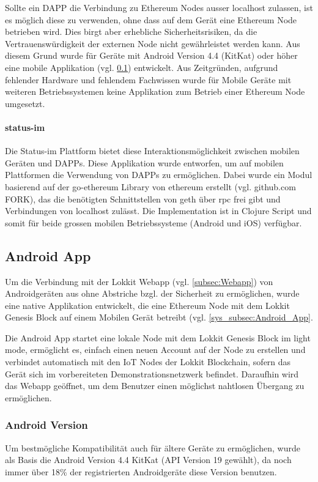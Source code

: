 Sollte ein \acrshort{DAPP} die Verbindung zu Ethereum Nodes ausser localhost zulassen, ist es möglich diese zu verwenden, ohne dass auf dem Gerät eine Ethereum Node betrieben wird. Dies birgt aber erhebliche Sicherheitsrisiken, da die Vertrauenswürdigkeit der externen Node nicht gewährleistet werden kann. Aus diesem Grund wurde für Geräte mit Android Version 4.4 (KitKat) oder höher eine mobile Applikation (vgl. \ref{subsec:Android_App}) entwickelt. Aus Zeitgründen, aufgrund fehlender Hardware und fehlendem Fachwissen wurde für Mobile Geräte mit weiteren Betriebssystemen keine Applikation zum Betrieb einer Ethereum Node umgesetzt.
\paragraph{status-im}
Die Status-im Plattform bietet diese Interaktionsmöglichkeit zwischen mobilen Geräten und \acrshort{DAPPs}. Diese Applikation wurde entworfen, um auf mobilen Plattformen die Verwendung von \acrshort{DAPPs} zu ermöglichen. Dabei wurde ein Modul basierend auf der go-ethereum Library von ethereum erstellt (vgl. github.com FORK), das die benötigten Schnittstellen von geth über rpc frei gibt und Verbindungen von localhost zulässt. Die Implementation ist in Clojure Script und somit für beide grossen mobilen Betriebssysteme (Android und iOS) verfügbar.\cite{status-im_whitepaper, github.com/status-im/status-go}

\subsection{Android App}
\label{subsec:Android_App}
Um die Verbindung mit der Lokkit Webapp (vgl. \ref{subsec:Webapp}) von Androidgeräten aus ohne Abstriche bzgl. der Sicherheit zu ermöglichen, wurde eine native Applikation entwickelt, die eine Ethereum Node mit dem Lokkit Genesis Block auf einem Mobilen Gerät betreibt (vgl. \ref{sys_subsec:Android_App}.

Die Android App startet eine lokale Node mit dem Lokkit Genesis Block im light mode, ermöglicht es, einfach einen neuen Account auf der Node zu erstellen und verbindet automatisch mit den IoT Nodes der Lokkit Blockchain, sofern das Gerät sich im vorbereiteten Demonstrationsnetzwerk befindet. Daraufhin wird das Webapp geöffnet, um dem Benutzer einen möglichst nahtlosen Übergang zu ermöglichen.
\subsubsection{Android Version}
Um bestmögliche Kompatibilität auch für ältere Geräte zu ermöglichen, wurde als Basis die Android Version 4.4 KitKat (API Version 19 gewählt), da noch immer über 18\% der registrierten Androidgeräte diese Version benutzen.\cite[Android/Dashboards]{developer.android.com}
